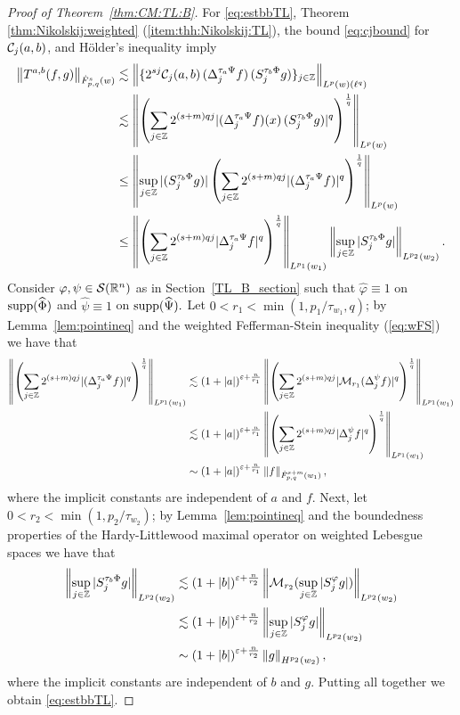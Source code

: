 \begin{proof}[Proof of Theorem~\ref{thm:CM:TL:B}]
For \eqref{eq:estbbTL},
Theorem \ref{thm:Nikolskij:weighted} (\ref{item:thh:Nikolskij:TL}), the bound \eqref{eq:cjbound} for $\mathcal{C}_j(a,b)$, and H\"older's inequality  imply
\begin{align*}
\left\|T^{a,b}(f,g)\right\|_{\dot{F}^s_{p,q}(w)} & \lesssim \left\|\{2^{sj} \mathcal{C}_j(a,b) \,(\Delta^{ \tau_a \Psi }_{j} f ) \, (S^{ \tau_b \Phi }_{j} g)\}_{j\in\mathbb{Z}} \right\|_{L^p(w)(\ell^q)}\\
& \lesssim \left\|\left(\sum\limits_{j \in \mathbb{Z}}  2^{(s +m) q j}  |(\Delta^{ \tau_a \Psi }_{j} f )(x) \, (S^{ \tau_b \Phi }_{j} g)|^q   \right)^\frac{1}{q}\right\|_{L^p(w)}\\
& \le\left\|\sup\limits_{j \in \mathbb{Z}} |(S^{ \tau_b \Phi }_{j} g)| \left(\sum\limits_{j \in \mathbb{Z}}  2^{(s +m) q j}  |(\Delta^{ \tau_a \Psi }_{j} f )|^q   \right)^\frac{1}{q}\right\|_{L^p(w)}\\
& \le \left\|\left(\sum_{j \in \mathbb{Z}}  2^{(s +m) q j}  |\Delta^{ \tau_a \Psi }_{j} f |^q   \right)^\frac{1}{q}\right\|_{L^{p_1}(w_1)} \left\|\sup\limits_{j \in \mathbb{Z}} |S^{ \tau_b \Phi }_{j} g|\right\|_{L^{p_2}(w_2)}.
\end{align*}
Consider $\varphi,\psi\in{\mathcal{S}}({{\mathbb R}^n})$ as in Section~\ref{TL_B_section} such that   $\widehat{\varphi}\equiv 1$ on ${\rm{supp}}(\widehat{\Phi})$ and  $\widehat{\psi}\equiv 1$ on ${\rm{supp}}(\widehat{\Psi}).$  Let   $0<r_1<\min(1, p_1/\tau_{w_1},q)$; by Lemma~\ref{lem:pointineq} and the weighted Fefferman-Stein inequality (\ref{eq:wFS}) we have that  
\begin{align*}
\left\|\left(\sum_{j \in \mathbb{Z}}  2^{(s +m) q j}  |(\Delta^{ \tau_a \Psi }_{j} f )|^q   \right)^\frac{1}{q}\right\|_{L^{p_1}(w_1)}&\lesssim (1+\left\vert a \right\vert)^{\varepsilon+\frac{n}{r_1}}
\left\|\left(\sum_{j \in \mathbb{Z}}  2^{(s +m) q j}  |\mathcal{M}_{r_1}(\Delta^{\psi }_{j} f) |^q   \right)^\frac{1}{q}\right\|_{L^{p_1}(w_1)}\\
&\lesssim (1+\left\vert a \right\vert)^{\varepsilon+\frac{n}{r_1}} \left\|\left(\sum_{j \in \mathbb{Z}}  2^{(s +m) q j}  |\Delta^{\psi }_{j} f|^q   \right)^\frac{1}{q}\right\|_{L^{p_1}(w_1)}\\
&\sim (1+\left\vert a \right\vert)^{\varepsilon+\frac{n}{r_1}}  \left\|f\right\|_{\dot{F}^{s+m}_{p,q}(w_1)},
\end{align*}
where the implicit constants are independent of $a$ and $f.$ Next, let  $0<r_2<\min(1,p_2/\tau_{w_2})$; by Lemma~\ref{lem:pointineq} and the boundedness properties of the Hardy-Littlewood maximal operator on weighted Lebesgue spaces  we have that  
\begin{align*}
\left\|\sup_{j\in\mathbb{Z}}|S^{\tau_b\Phi}_{j}g|\right\|_{L^{p_2}(w_2)}&\lesssim (1+\left\vert b \right\vert)^{\varepsilon+\frac{n}{r_2}} \left\|\mathcal{M}_{r_2}(\sup_{j\in\mathbb{Z}}|S^{\varphi}_{j}g|)\right\|_{L^{p_2}(w_2)}\\
&\lesssim (1+\left\vert b \right\vert)^{\varepsilon+\frac{n}{r_2}} \left\|\sup_{j\in\mathbb{Z}}|S^{\varphi}_{j}g|\right\|_{L^{p_2}(w_2)}\\
&\sim (1+\left\vert b \right\vert)^{\varepsilon+\frac{n}{r_2}} \left\|g\right\|_{H^{p_2}(w_2)},
\end{align*}
where the implicit constants are independent of $b$ and $g.$ Putting all together we obtain \eqref{eq:estbbTL}.



\end{proof}
